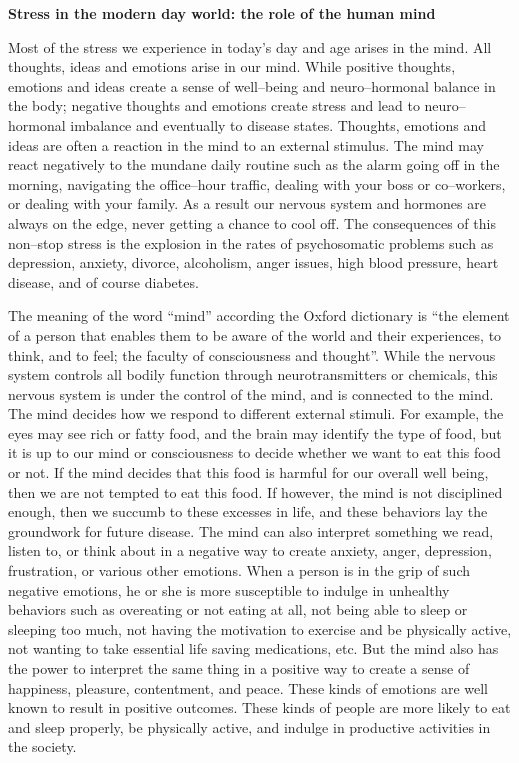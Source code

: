 \textbf{Stress in the modern day world: the role of the human mind}

Most of the stress we experience in today’s day and age arises in the mind. All thoughts, ideas and emotions arise in our mind. While positive thoughts, emotions and ideas create a sense of well–being and neuro–hormonal balance in the body; negative thoughts and emotions create stress and lead to neuro–hormonal imbalance and eventually to disease states. Thoughts, emotions and ideas are often a reaction in the mind to an external stimulus. The mind may react negatively to the mundane daily routine such as the alarm going off in the morning, navigating the office–hour traffic, dealing with your boss or co–workers, or dealing with your family. As a result our nervous system and hormones are always on the edge, never getting a chance to cool off. The consequences of this non–stop stress is the explosion in the rates of psychosomatic problems such as depression, anxiety, divorce, alcoholism, anger issues, high blood pressure, heart disease, and of course diabetes.

The meaning of the word “mind” according the Oxford dictionary is “the element of a person that enables them to be aware of the world and their experiences, to think, and to feel; the faculty of consciousness and thought”. While the nervous system controls all bodily function through neurotransmitters or chemicals, this nervous system is under the control of the mind, and is connected to the mind. The mind decides how we respond to different external stimuli. For example, the eyes may see rich or fatty food, and the brain may identify the type of food, but it is up to our mind or consciousness to decide whether we want to eat this food or not. If the mind decides that this food is harmful for our overall well being, then we are not tempted to eat this food. If however, the mind is not disciplined enough, then we succumb to these excesses in life, and these behaviors lay the groundwork for future disease. The mind can also interpret something we read, listen to, or think about in a negative way to create anxiety, anger, depression, frustration, or various other emotions. When a person is in the grip of such negative emotions, he or she is more susceptible to indulge in unhealthy behaviors such as overeating or not eating at all, not being able to sleep or sleeping too much, not having the motivation to exercise and be physically active, not wanting to take essential life saving medications, etc. But the mind also has the power to interpret the same thing in a positive way to create a sense of happiness, pleasure, contentment, and peace. These kinds of emotions are well known to result in positive outcomes. These kinds of people are more likely to eat and sleep properly, be physically active, and indulge in productive activities in the society.

